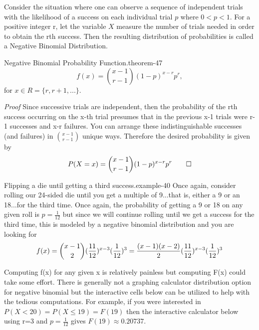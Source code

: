 \documentclass[10pt,]{book}
\makeatletter
\renewcommand*{\proofname}{Proof}
\renewenvironment{proof}[1][\proofname]{\par
  \pushQED{\qed}%
  \normalfont \topsep6\p@\@plus6\p@\relax
  \trivlist
  \item\relax
    {\itshape
    #1\@addpunct{.}}\hspace\labelsep\ignorespaces
}{%
  \popQED\endtrivlist\@endpefalse
}
\numberwithin{equation}{section}
\newcommand{\lt}{<}
\makeatother
\begin{document}
%
\par
\hypertarget{p-973}{}%
Consider the situation where one can observe a sequence  of independent trials with the likelihood of a success on each individual trial \(p\) where \(0 \lt p \lt 1 \). For a positive integer r, let the variable \(X\) measure the number of trials needed in order to obtain the rth success. Then the resulting distribution of probabilities is called a Negative Binomial Distribution.%
\par
\hypertarget{p-974}{}%
\begin{theorem}{Negative Binomial Probability Function.}{}{theorem-47}%
\hypertarget{NegativeBinomialProbabilityFunction}{}%
%
\begin{equation*}
f(x) = \binom{x - 1}{r-1}(1-p)^{x-r}p^r,
\end{equation*}
for \(x \in R = \{r, r+1, ... \}\).%
\end{theorem}
\begin{proof}\hypertarget{proof-50}{}
\hypertarget{p-976}{}%
Since successive trials are independent, then the probability of the rth success occurring on the x-th trial presumes that in the previous x-1 trials were r-1 successes and x-r failures. You can arrange these indistinguishable successes (and failures) in \(\binom{x-1}{r-1}\) unique ways. Therefore the desired probability is given by%
\begin{equation*}
P(X=x) = \binom{x - 1}{r-1}(1-p)^{x-r}p^r\qedhere
\end{equation*}
%
\end{proof}
%
\begin{example}{Flipping a die until getting a third success.}{example-40}%
\hypertarget{p-977}{}%
Once again, consider rolling our 24-sided die until you get a multiple of 9...that is, either a 9 or an 18...for the third time. Once again, the probability of getting a 9 or 18 on any given roll is \(p = \frac{1}{12}\) but since we will continue rolling until we get a success for the third time, this is modeled by a negative binomial distribution and you are looking for%
\begin{equation*}
f(x) = \binom{x-1}{2}(\frac{11}{12})^{x-3} (\frac{1}{12})^3  \\
= \frac{(x-1)(x-2)}{2}(\frac{11}{12})^{x-3} (\frac{1}{12})^3
\end{equation*}
%
\par
\hypertarget{p-978}{}%
Computing f(x) for any given x is relatively painless but computing F(x) could take some effort. There is generally not a graphing calculator distribution option for negative binomial but the interactive cells below can be utilized to help with the tedious computations. For example, if you were interested in \(P(X \lt 20) = P(X \le 19 ) = F(19)\) then the interactive calculator below using r=3 and \(p = \frac{1}{12}\) gives \(F(19) \approx 0.20737.\)%
\end{example}
\end{document}
